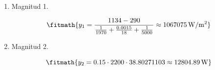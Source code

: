 \begin{enumerate}

\item Magnitud 1.

\[\fitmath{y_{1}=\frac{1134-290}{\frac{1}{1970}+\frac{0.0015}{18}+\frac{1}{5000}}\approx 1067075\,\mathrm{W/m^{2}}}\]

\item Magnitud 2.

\[\fitmath{y_{2}=0.15\cdot 2200\cdot 38.80271103\approx 12804.89\,\mathrm{W}}\]

\end{enumerate}
